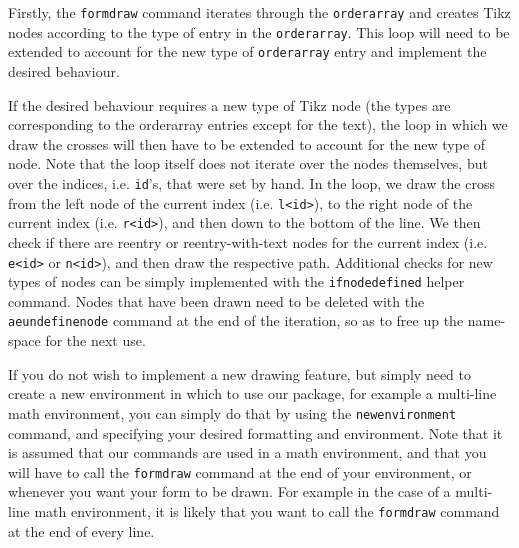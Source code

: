 \documentclass[12pt]{article}
\newcommand{\BS}{\texttt{\symbol{`\\}}}
\newcommand{\Macro}[1]{\texttt{\BS#1}}
\begin{document}
Firstly, the \Macro{formdraw} command iterates through the \Macro{orderarray} and creates Tikz nodes according to the type of entry in the \Macro{orderarray}. This loop will need to be extended to account for the new type of \Macro{orderarray} entry and implement the desired behaviour.

If the desired behaviour requires a new type of Tikz node (the types are corresponding to the orderarray entries except for the text), the loop in which we draw the crosses will then have to be extended to account for the new type of node. Note that the loop itself does not iterate over the nodes themselves, but over the indices, i.e. \texttt{id}'s, that were set by hand. In the loop, we draw the cross from the left node of the current index (i.e. \texttt{l<id>}), to the right node of the current index (i.e. \texttt{r<id>}), and then down to the bottom of the line. We then check if there are reentry or reentry-with-text nodes for the current index (i.e. \texttt{e<id>} or \texttt{n<id>}), and then draw the respective path. Additional checks for new types of nodes can be simply implemented with the \Macro{ifnodedefined} helper command. Nodes that have been drawn need to be deleted with the \Macro{aeundefinenode} command at the end of the iteration, so as to free up the name-space for the next use.

If you do not wish to implement a new drawing feature, but simply need to create a new environment in which to use our package, for example a multi-line math environment, you can simply do that by using the \Macro{newenvironment} command, and specifying your desired formatting and environment. Note that it is assumed that our commands are used in a math environment, and that you will have to call the \Macro{formdraw} command at the end of your environment, or whenever you want your form to be drawn. For example in the case of a multi-line math environment, it is likely that you want to call the \Macro{formdraw} command at the end of every line.


{}
%
\end{document}
